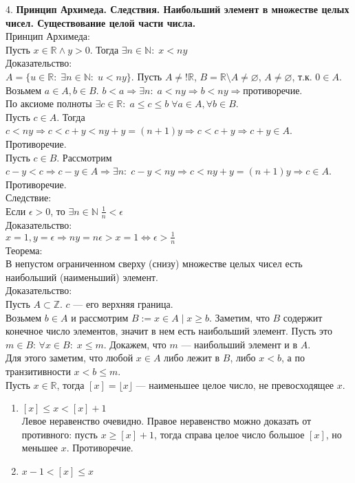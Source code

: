 \documentclass[12pt]{article}
\begin{document}
4. \textbf{Принцип Архимеда. Следствия. Наибольший элемент в множестве целых чисел. Существование целой части числа.}\\
Принцип Архимеда:\\
Пусть $x \in \mathbb{R} \land y > 0$. Тогда  $\exists n \in \mathbb{N}:\; x < ny$\\
Доказательство:\\
$A = \{u \in \mathbb{R}:\; \exists n \in \mathbb{N}:\; u < ny\}$. Пусть $A \neq! \mathbb{R}$, $B = \mathbb{R} \setminus A \neq \varnothing$,  $A \neq \varnothing$, т.к.  $0 \in A$.\\
Возьмем  $a \in A, b \in B$.  $b < a \Rightarrow \exists n: \; a < ny \Rightarrow b < ny \Rightarrow \texttt{противоречие}$. \\
По аксиоме полноты $\exists c \in \mathbb{R}: \; a \le c \le b \; \forall a \in A, \forall b \in B$.\\
Пусть $c \in A$. Тогда  $c < ny \Rightarrow c < c + y < ny + y = (n+1)y \Rightarrow c < c + y \Rightarrow c + y \in A$. Противоречие.\\
Пусть  $c \in B$.  Рассмотрим $c-y<c \Rightarrow c-y \in A \Rightarrow \exists n: \; c - y < ny \Rightarrow c < ny + y = (n+1)y \Rightarrow c \in A$. Противоречие.\\

Следствие:\\
Если $\epsilon > 0$, то $\exists n \in \mathbb{N} \; \frac{1}{n} < \epsilon$\\
Доказательство:\\
$x = 1, y = \epsilon \Rightarrow ny = n \epsilon > x = 1 \iff \epsilon > \frac{1}{n}$\\

Теорема:\\
В непустом ограниченном сверху (снизу) множестве целых чисел есть наибольший (наименьший) элемент.\\
Доказательство:\\
Пусть $A \subset \mathbb{Z}$.  $c$ --- его верхняя граница.\\
Возьмем  $b \in A$ и рассмотрим  $B := {x \in A \mid x \ge b}$. Заметим, что $B$ содержит конечное число элементов, значит в нем есть наибольший элемент. Пусть это $m \in B$:  $\forall x \in B:\; x \le m$. Докажем, что $m$ --- наибольший элемент и в  $A$.\\
Для этого заметим, что любой $x \in A$ либо лежит в $B$, либо  $x < b$, а по транзитивности  $x < b \le m$.\\

Пусть $x \in \mathbb{R}$, тогда  $[x] = \lfloor x \rfloor$ --- наименьшее целое число, не превосходящее  $x$.
\begin{enumerate}
    \item $[x]  \le x < [x] + 1$\\
        Левое неравенство очевидно. Правое неравенство можно доказать от противного: пусть $x \ge [x] + 1$, тогда справа целое число большое $[x]$, но меньшее  $x$. Противоречие.
    \item $x - 1 < [x] \le x$
\end{enumerate}
\end{document}
